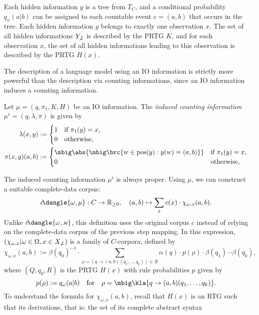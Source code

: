 Each hidden information $y$ is a tree from $T_C$, and a conditional probability
$q_\omega(a|b)$ can be assigned to each countable event $c = (a,b)$ that occurs
in the tree. Each hidden information $y$ belongs to exactly one observation
$x$. The set of all hidden informations $Y_{\not\bot}$ is described by the PRTG
$K$, and for each observation $x$, the set of all hidden informations leading
to this observation is described by the PRTG $H(x)$.

The description of a language model using an IO information is strictly more
powerful than the description via counting informations, since an IO
information induces a counting information.

\begin{definition}
 Let $\mu=(q,\pi_1,K,H)$ be an IO information. The \emph{induced counting
 information} $\mu^\flat = (q,\lambda,\pi)$ is given by
 \begin{align*}
  \lambda(x,y) &:= \begin{cases}
   1 & \text{if } \pi_1(y) = x, \\
   0 & \text{otherwise},
  \end{cases} \\
  \pi(x,y)(a,b) &:= \begin{cases}
   \mbig\abs{\mbig\brc{w\in\pos(y): y(w)=(a,b)}} & \text{if } \pi_1(y) = x, \\
   0 & \text{otherwise},
  \end{cases}
 \end{align*}
\end{definition}
The induced counting information $\mu^\flat$ is always proper.
\cite[p.~15]{bucstuvog15} Using $\mu$, we can construct a suitable complete-data corpus:
\[
 c\!\dangle{\omega,\mu}: C\to\zr_{\geq0}, \quad
 (a,b) \mapsto \sum_x c(x) \cdot \chi_{\omega,x}(a,b).
\]
Unlike $c\!\dangle{\omega,\varkappa}$, this definition uses the original corpus
$c$ instead of relying on the complete-data corpus of the previous step
mapping. In this expression, $(\chi_{\omega,x}|\omega\in\Omega,x\in
X_{\not\bot})$ is a family of $C$-corpora, defined by
\[
 \chi_{\omega,x}(a,b) := \beta(q_0)^{-1} \cdot \sum_{\rho = (q\to(a,b)(q_1,\ldots,q_k))\in R} \alpha(q) \cdot p(\rho) \cdot \beta(q_1) \cdots \beta(q_k),
\]
where $(Q,q_0,R)$ is the PRTG $H(x)$ with rule probabilities $p$ given by
\[
 p(\rho) := q_\omega(a|b) \quad\text{for}\quad \rho = \mbig\kla{q\to(a,b)(q_1,\ldots,q_k)}.
\]
To understand the formula for $\chi_{\omega,x}(a,b)$, recall that $H(x)$ is an
RTG such that its derivations, that is: the set of its complete abstract syntax
